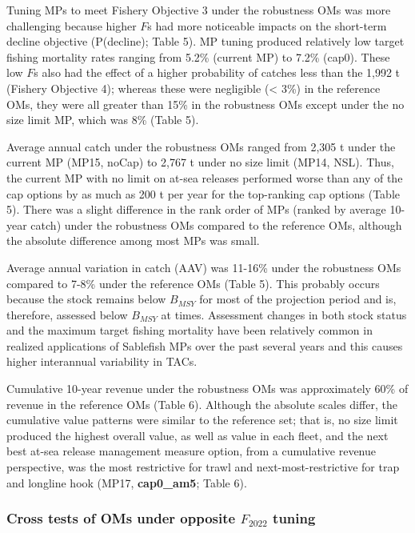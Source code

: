 \documentclass[11pt]{book}
\begin{document}
Tuning MPs to meet Fishery Objective 3 under the robustness OMs was more challenging because higher \(F\)s had more noticeable impacts on the short-term decline objective (P(decline); Table 5). MP tuning produced relatively low target fishing mortality rates ranging from 5.2\% (current MP) to 7.2\% (cap0). These low \(F\)s also had the effect of a higher probability of catches less than the 1,992 t (Fishery Objective 4); whereas these were negligible (\textless{} 3\%) in the reference OMs, they were all greater than 15\% in the robustness OMs except under the no size limit MP, which was 8\% (Table 5).

Average annual catch under the robustness OMs ranged from 2,305 t under the current MP (MP15, noCap) to 2,767 t under no size limit (MP14, NSL). Thus, the current MP with no limit on at-sea releases performed worse than any of the cap options by as much as 200 t per year for the top-ranking cap options (Table 5). There was a slight difference in the rank order of MPs (ranked by average 10-year catch) under the robustness OMs compared to the reference OMs, although the absolute difference among most MPs was small.

Average annual variation in catch (AAV) was 11-16\% under the robustness OMs compared to 7-8\% under the reference OMs (Table 5). This probably occurs because the stock remains below \(B_{MSY}\) for most of the projection period and is, therefore, assessed below \(B_{MSY}\) at times. Assessment changes in both stock status and the maximum target fishing mortality have been relatively common in realized applications of Sablefish MPs over the past several years and this causes higher interannual variability in TACs.

Cumulative 10-year revenue under the robustness OMs was approximately 60\% of revenue in the reference OMs (Table 6). Although the absolute scales differ, the cumulative value patterns were similar to the reference set; that is, no size limit produced the highest overall value, as well as value in each fleet, and the next best at-sea release management measure option, from a cumulative revenue perspective, was the most restrictive for trawl and next-most-restrictive for trap and longline hook (MP17, \textbf{cap0\_am5}; Table 6).

\hypertarget{cross-tests-of-oms-under-opposite-f_2022-tuning}{%
\subsubsection{\texorpdfstring{Cross tests of OMs under opposite \(F_{2022}\) tuning}{Cross tests of OMs under opposite F\_\{2022\} tuning}}\label{cross-tests-of-oms-under-opposite-f_2022-tuning}}
\end{document}
